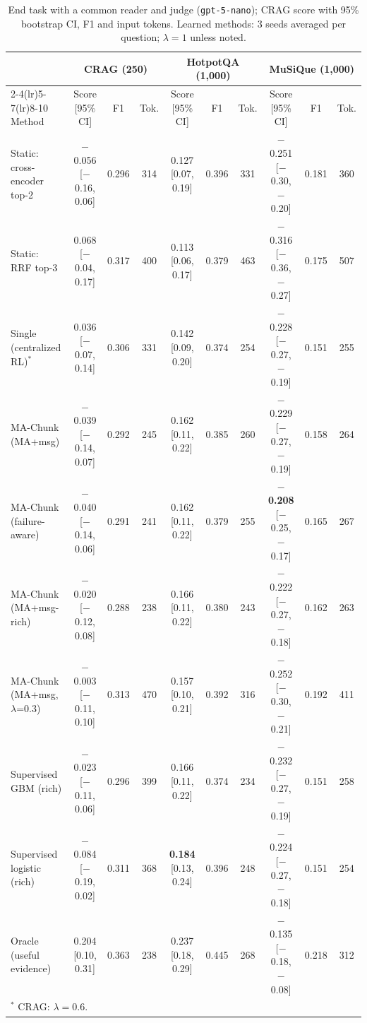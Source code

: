 \documentclass[sigconf,anonymous]{aamas}
\newcommand{\method}{MA-Chunk}
\theoremstyle{plain}
\theoremstyle{definition}
\begin{document}
\begin{table}[t]
\centering\small
\caption{End task with a common reader and judge (\texttt{gpt-5-nano}); CRAG score with 95\% bootstrap CI, F1 and input tokens. Learned methods: 3 seeds averaged per question; $\lambda=1$ unless noted.}
\label{tab:endtask}
\setlength{\tabcolsep}{3pt}
\begin{tabular}{l ccc ccc ccc}
\toprule
 & \multicolumn{3}{c}{CRAG (250)} & \multicolumn{3}{c}{HotpotQA (1{,}000)} & \multicolumn{3}{c}{MuSiQue (1{,}000)} \\
\cmidrule(lr){2-4}\cmidrule(lr){5-7}\cmidrule(lr){8-10}
Method & Score [95\% CI] & F1 & Tok. & Score [95\% CI] & F1 & Tok. & Score [95\% CI] & F1 & Tok. \\
\midrule
Static: cross-encoder top-2 & $-$0.056 [$-$0.16, 0.06] & 0.296 & 314 & 0.127 [0.07, 0.19] & 0.396 & 331 & $-$0.251 [$-$0.30, $-$0.20] & 0.181 & 360 \\
Static: RRF top-3 & 0.068 [$-$0.04, 0.17] & 0.317 & 400 & 0.113 [0.06, 0.17] & 0.379 & 463 & $-$0.316 [$-$0.36, $-$0.27] & 0.175 & 507 \\
Single (centralized RL)$^{*}$ & 0.036 [$-$0.07, 0.14] & 0.306 & 331 & 0.142 [0.09, 0.20] & 0.374 & 254 & $-$0.228 [$-$0.27, $-$0.19] & 0.151 & 255 \\
\method{} (MA+msg) & $-$0.039 [$-$0.14, 0.07] & 0.292 & 245 & 0.162 [0.11, 0.22] & 0.385 & 260 & $-$0.229 [$-$0.27, $-$0.19] & 0.158 & 264 \\
\method{} (failure-aware) & $-$0.040 [$-$0.14, 0.06] & 0.291 & 241 & 0.162 [0.11, 0.22] & 0.379 & 255 & \textbf{$-$0.208} [$-$0.25, $-$0.17] & 0.165 & 267 \\
\method{} (MA+msg-rich) & $-$0.020 [$-$0.12, 0.08] & 0.288 & 238 & 0.166 [0.11, 0.22] & 0.380 & 243 & $-$0.222 [$-$0.27, $-$0.18] & 0.162 & 263 \\
\method{} (MA+msg, $\lambda$=0.3) & $-$0.003 [$-$0.11, 0.10] & 0.313 & 470 & 0.157 [0.10, 0.21] & 0.392 & 316 & $-$0.252 [$-$0.30, $-$0.21] & 0.192 & 411 \\
Supervised GBM (rich) & $-$0.023 [$-$0.11, 0.06] & 0.296 & 399 & 0.166 [0.11, 0.22] & 0.374 & 234 & $-$0.232 [$-$0.27, $-$0.19] & 0.151 & 258 \\
Supervised logistic (rich) & $-$0.084 [$-$0.19, 0.02] & 0.311 & 368 & \textbf{0.184} [0.13, 0.24] & 0.396 & 248 & $-$0.224 [$-$0.27, $-$0.18] & 0.151 & 254 \\
\midrule
Oracle (useful evidence) & 0.204 [0.10, 0.31] & 0.363 & 238 & 0.237 [0.18, 0.29] & 0.445 & 268 & $-$0.135 [$-$0.18, $-$0.08] & 0.218 & 312 \\
\bottomrule
\multicolumn{10}{l}{\footnotesize $^{*}$ CRAG: $\lambda=0.6$.}
\end{tabular}
\end{table}
\end{document}
